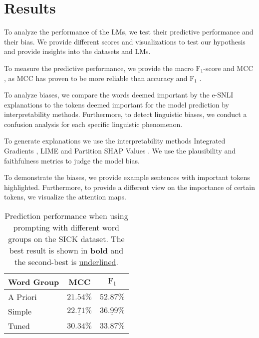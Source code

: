 \section{Results} \label{sec:results}

To analyze the performance of the \acp{LM}, we test their predictive performance and their bias. We provide different scores and visualizations to test our hypothesis and provide insights into the datasets and \acp{LM}.

To measure the predictive performance, we provide the macro $\text{F}_1$-score \cite{macrof1} and \ac{MCC} \cite{mcc}, as \ac{MCC} has proven to be more reliable than accuracy and $\text{F}_1$ \cite{mccGood}.

To analyze biases, we compare the words deemed important by the \ac{e-SNLI} explanations to the tokens deemed important for the model prediction by interpretability methods. Furthermore, to detect linguistic biases, we conduct a confusion analysis for each specific linguistic phenomenon.

To generate explanations we use the interpretability methods Integrated Gradients \cite{integratedgradients}, \ac{LIME} \cite{lime} and Partition SHAP Values \cite{shap}. We use the plausibility and faithfulness \cite{ferret} metrics to judge the model bias.

To demonstrate the biases, we provide example sentences with important tokens highlighted. Furthermore, to provide a different view on the importance of certain tokens, we visualize the attention maps.

\begin{table}[ht!]
    \centering
    \caption{Prediction performance when using prompting with different word groups on the \acs{SICK} dataset. The best result is shown in \textbf{bold} and the second-best is \underline{underlined}.}
    \begin{tabular}{l c c}
        \toprule
        \multicolumn{1}{c}{Word Group} & \acs{MCC} & $\text{F}_1$ \\
        \midrule
        A Priori & $21.54\%$ & $\mathbf{52.87\%}$ \\
        Simple & $\underline{22.71\%}$ & $\underline{36.99\%}$ \\
        Tuned & $\mathbf{30.34\%}$ & $33.87\%$ \\
        \bottomrule
    \end{tabular}
\end{table}


